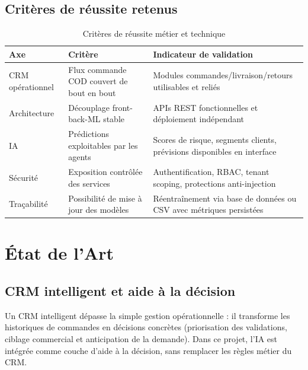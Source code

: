 \documentclass[12pt,a4paper]{report}
\begin{document}
\section{Crit\`{e}res de r\'{e}ussite retenus}

\begin{table}[H]
\centering
\caption{Crit\`{e}res de r\'{e}ussite m\'{e}tier et technique}
\label{tab:success_criteria}
\begin{tabularx}{\textwidth}{l X X}
\toprule
\textbf{Axe} & \textbf{Crit\`{e}re} & \textbf{Indicateur de validation} \\
\midrule
CRM op\'{e}rationnel & Flux commande COD couvert de bout en bout & Modules commandes/livraison/retours utilisables et reli\'{e}s \\
Architecture & D\'{e}couplage front-back-ML stable & APIs REST fonctionnelles et d\'{e}ploiement ind\'{e}pendant \\
IA & Pr\'{e}dictions exploitables par les agents & Scores de risque, segments clients, pr\'{e}visions disponibles en interface \\
S\'{e}curit\'{e} & Exposition contr\^{o}l\'{e}e des services & Authentification, RBAC, tenant scoping, protections anti-injection \\
Tra\c{c}abilit\'{e} & Possibilit\'{e} de mise \`{a} jour des mod\`{e}les & R\'{e}entra\^{i}nement via base de donn\'{e}es ou CSV avec m\'{e}triques persist\'{e}es \\
\bottomrule
\end{tabularx}
\end{table}


\chapter{\'{E}tat de l'Art}

\section{CRM intelligent et aide \`{a} la d\'{e}cision}

Un CRM intelligent d\'{e}passe la simple gestion op\'{e}rationnelle : il transforme les historiques de commandes en d\'{e}cisions concr\`{e}tes (priorisation des validations, ciblage commercial et anticipation de la demande). Dans ce projet, l'IA est int\'{e}gr\'{e}e comme couche d'aide \`{a} la d\'{e}cision, sans remplacer les r\`{e}gles m\'{e}tier du CRM.
\end{document}
